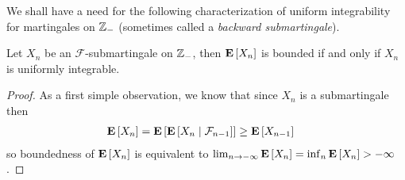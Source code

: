 We shall have a need for the following characterization of uniform
integrability for martingales on $\integers_-$ (sometimes called a
\emph{backward submartingale}).
\begin{lem}\label{BackwardSubmartingaleBoundedUniformlyIntegrable}Let $X_n$ be an $\mathcal{F}$-submartingale on
  $\integers_-$, then $\expectation{X_n}$ is bounded if and only if $X_n$ is
  uniformly integrable.
\end{lem}
\begin{proof}
As a first simple observation, we know that since $X_n$ is a
submartingale then 
\begin{align*}
\expectation{X_n}  &=
\expectation{\cexpectationlong{\mathcal{F}_{n-1}}{X_n}} \geq
\expectation{X_{n-1}}
\end{align*}
so boundedness of $\expectation{X_n}$ is equivalent to $\lim_{n \to -\infty}
\expectation{X_n} = \inf_n \expectation{X_n} > -\infty$.


\end{proof}
